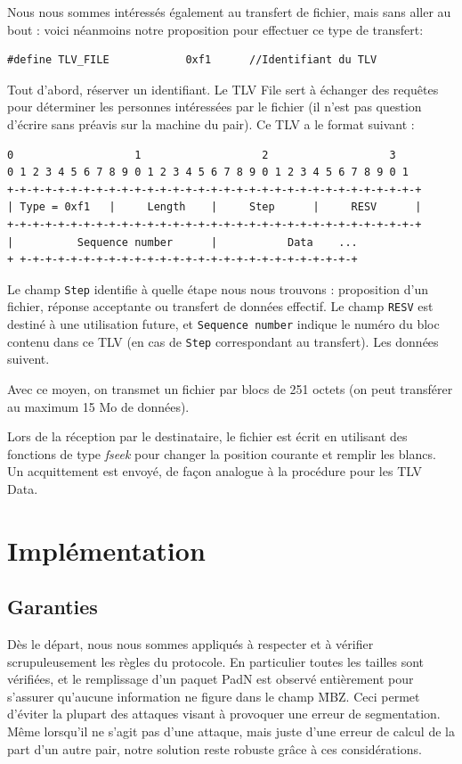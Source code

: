 \documentclass[11pt,a4paper]{article}
\begin{document}
Nous nous sommes intéressés également au transfert de fichier, mais sans aller au bout : voici néanmoins notre proposition pour effectuer ce type de transfert:

\begin{lstlisting}
#define TLV_FILE			0xf1      //Identifiant du TLV
\end{lstlisting}

Tout d'abord, réserver un identifiant. Le TLV File sert à échanger des requêtes pour déterminer les personnes intéressées par le fichier (il n'est pas question
d'écrire sans préavis sur la machine du pair). Ce TLV a le format suivant :

\begin{verbatim}
0                   1                   2                   3
0 1 2 3 4 5 6 7 8 9 0 1 2 3 4 5 6 7 8 9 0 1 2 3 4 5 6 7 8 9 0 1
+-+-+-+-+-+-+-+-+-+-+-+-+-+-+-+-+-+-+-+-+-+-+-+-+-+-+-+-+-+-+-+-+
| Type = 0xf1   |     Length    |     Step      |     RESV      |
+-+-+-+-+-+-+-+-+-+-+-+-+-+-+-+-+-+-+-+-+-+-+-+-+-+-+-+-+-+-+-+-+
|          Sequence number      |           Data    ...	         
+ +-+-+-+-+-+-+-+-+-+-+-+-+-+-+-+-+-+-+-+-+-+-+-+-+-+-+
\end{verbatim}

Le champ \texttt{Step} identifie à quelle étape nous nous trouvons : proposition d'un fichier, réponse acceptante ou transfert
de données effectif. Le champ \texttt{RESV} est destiné à une
utilisation future, et \texttt{Sequence number} indique le numéro du bloc contenu dans ce TLV (en cas de \texttt{Step} correspondant au transfert).
Les données suivent.

Avec ce moyen, on transmet un fichier par blocs de 251 octets (on peut transférer au maximum 15 Mo de données). 

Lors de la réception par le destinataire, le fichier est écrit en utilisant des fonctions de type \emph{fseek} pour changer la position courante et remplir
les blancs. Un acquittement est envoyé, de façon analogue à la procédure pour les TLV Data.

\section{Implémentation}

\subsection{Garanties}

Dès le départ, nous nous sommes appliqués à respecter et à vérifier scrupuleusement les règles du protocole. En particulier toutes les tailles sont vérifiées, et le remplissage
d'un paquet PadN est observé entièrement pour s'assurer qu'aucune information ne figure dans le champ \f{MBZ}. Ceci permet d'éviter la plupart des attaques visant à provoquer 
une erreur de segmentation. Même lorsqu'il ne s'agit pas d'une attaque, mais juste d'une erreur de calcul de la part d'un autre pair, notre solution reste robuste grâce à
ces considérations.
\end{document}
